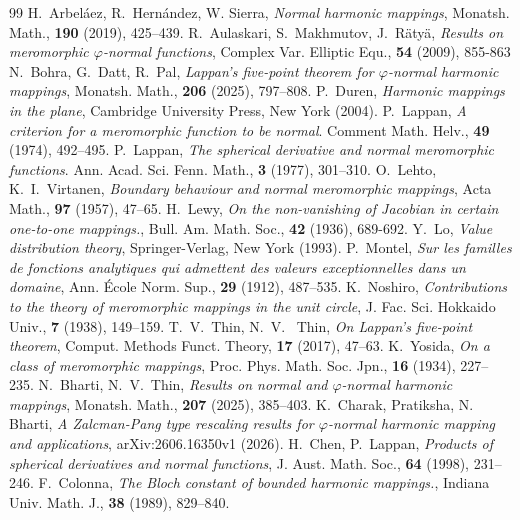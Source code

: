 \documentclass[10pt,a4paper]{amsart}
\numberwithin{equation}{section}
\begin{document}
\begin{thebibliography}{99}
 H.~Arbel\'aez, R.~Hern\'andez, W. Sierra, \textit{Normal harmonic mappings}, Monatsh. Math., {\bf 190} (2019), 425--439.\smallskip
{} R.~Aulaskari, S.~Makhmutov, J.~R\"aty\"a, \textit{Results on meromorphic $\varphi$-normal functions}, Complex Var. Elliptic Equ., {\bf 54} (2009), 855-863 \smallskip
{} N.~Bohra, G.~Datt, R.~Pal, \textit{Lappan's five-point theorem for $\varphi$-normal harmonic mappings}, Monatsh. Math., {\bf206} (2025), 797--808.\smallskip
{} P.~Duren, {\it Harmonic mappings in the plane}, Cambridge University Press, New York (2004).\smallskip
{} P.~Lappan, \textit{A criterion for a meromorphic function to be normal}. Comment Math. Helv., {\bf 49} (1974), 492--495.\smallskip
{} P.~Lappan, \textit{The spherical derivative and normal meromorphic functions}. Ann. Acad. Sci. Fenn. Math., {\bf 3} (1977), 301--310.
 O.~Lehto, K.~I.~Virtanen, \textit{Boundary behaviour and normal meromorphic mappings}, Acta Math., \textbf{97} (1957), 47--65.\smallskip
{} H.~Lewy, \textit{On the non-vanishing of Jacobian in certain one-to-one mappings.}, Bull. Am. Math. Soc., {\bf 42} (1936), 689-692.\smallskip
{} Y.~Lo, \textit{Value distribution theory}, Springer-Verlag, New York (1993).\smallskip
{} P.~Montel, \textit{Sur les familles de fonctions analytiques qui admettent des valeurs exceptionnelles dans un domaine}, Ann. \'Ecole Norm. Sup., \textbf{29} (1912), 487--535.\smallskip
{} K.~Noshiro, \textit{Contributions to the theory of meromorphic mappings in the unit circle}, J. Fac. Sci. Hokkaido Univ., \textbf{7} (1938), 149--159.\smallskip
{} T.~V.~Thin, N.~V.~ Thin, {\it On Lappan's five-point theorem}, Comput. Methods Funct. Theory, {\bf 17} (2017), 47--63.\smallskip
{} K.~Yosida, \textit{On a class of meromorphic mappings}, Proc. Phys. Math. Soc. Jpn., \textbf{16} (1934), 227--235.\smallskip
{} N.~Bharti, N.~V.~Thin, {\it Results on normal and $\varphi$-normal harmonic mappings}, Monatsh. Math., {\bf 207} (2025), 385--403.\smallskip
{} K.~Charak, Pratiksha, N. Bharti, \textit{A Zalcman-Pang type rescaling results for $\varphi$-normal harmonic mapping and applications}, arXiv:2606.16350v1 (2026).\smallskip
{} H.~Chen, P.~Lappan, {\it Products of spherical derivatives and normal functions}, J. Aust. Math. Soc., {\bf 64} (1998), 231--246.\smallskip
{} F.~Colonna, \textit{The Bloch constant of bounded harmonic mappings.}, Indiana Univ. Math. J., {\bf 38} (1989), 829--840.\smallskip
\end{thebibliography}
\end{document}

